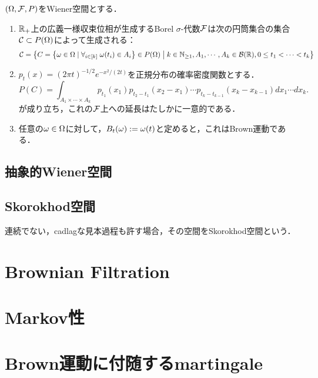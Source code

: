 \documentclass[uplatex,dvipdfmx]{jsreport}
\begin{document}
\begin{proposition}
    $(\Omega,\mathcal{F},P)$をWiener空間とする．
    \begin{enumerate}
        \item $\mathbb{R}_+$上の広義一様収束位相が生成するBorel $\sigma$-代数$\mathcal{F}$は次の円筒集合の集合$\mathcal{C}\subset P(\Omega)$によって生成される：
        \[\mathcal{C}=\left\{C=\left\{\omega\in\Omega\mid\forall_{i\in[k]}\;\omega(t_i)\in A_i\right\}\in P(\Omega)\;\middle|\;k\in\mathbb{N}_{\ge1},A_1,\cdots,A_k\in\mathcal{B}(\mathbb{R}),0\le t_1<\cdots<t_k\right\}\]
        \item $p_t(x)=(2\pi t)^{-1/2}e^{-x^2/(2t)}$を正規分布の確率密度関数とする．
        \[P(C)=\int_{A_1\times\cdots\times A_k}p_{t_1}(x_1)p_{t_2-t_1}(x_2-x_1)\cdots p_{t_k-t_{k-1}}(x_k-x_{k-1})dx_1\cdots dx_k.\]
        が成り立ち，これの$\mathcal{F}$上への延長はたしかに一意的である．
        \item 任意の$\omega\in\Omega$に対して，$B_t(\omega):=\omega(t)$と定めると，これはBrown運動である．
    \end{enumerate}
\end{proposition}

\subsection{抽象的Wiener空間}

\subsection{Skorokhod空間}

\begin{tcolorbox}[colframe=ForestGreen, colback=ForestGreen!10!white,breakable,colbacktitle=ForestGreen!40!white,coltitle=black,fonttitle=\bfseries\sffamily,
title=]
    連続でない，cadlagな見本過程も許す場合，その空間をSkorokhod空間という．
\end{tcolorbox}

\section{Brownian Filtration}

\section{Markov性}

\section{Brown運動に付随するmartingale}
\end{document}
